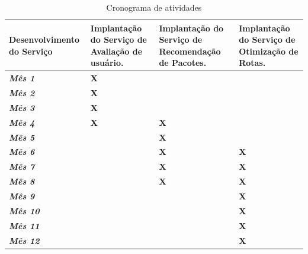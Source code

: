 	\begin{table}[H]
		\centering
		\caption{Cronograma de atividades}
		\begin{tabularx}{\linewidth}{|*4{>{\centering\arraybackslash}X|}}
			\toprule
			\textbf{Desenvolvimento do Serviço} & \textbf{Implantação do Serviço de Avaliação de usuário.} & \textbf{Implantação do Serviço de Recomendação de Pacotes.} & \textbf{Implantação do Serviço de Otimização de Rotas.} \\
			\midrule
			\textit{\textbf{Mês 1}} & \textbf{X} & \textbf{} & \textbf{} \\ [1.2ex] \hline
			\textit{\textbf{Mês 2}} & \textbf{X} & \textbf{} & \textbf{} \\ [1.2ex] \hline
			\textit{\textbf{Mês 3}} & \textbf{X} & \textbf{} & \textbf{} \\ [1.2ex] \hline
			\textit{\textbf{Mês 4}} & \textbf{X} & \textbf{X} & \textbf{} \\ [1.2ex] \hline
			\textit{\textbf{Mês 5}} & \textbf{} & \textbf{X} & \textbf{} \\ [1.2ex] \hline
			\textit{\textbf{Mês 6}} & \textbf{} & \textbf{X} & \textbf{X} \\ [1.2ex] \hline
			\textit{\textbf{Mês 7}} & \textbf{} & \textbf{X} & \textbf{X} \\ [1.2ex] \hline
			\textit{\textbf{Mês 8}} & \textbf{} & \textbf{X} & \textbf{X} \\ [1.2ex] \hline
			\textit{\textbf{Mês 9}} & \textbf{} & \textbf{} & \textbf{X} \\ [1.2ex] \hline
			\textit{\textbf{Mês 10}} & \textbf{} & \textbf{} & \textbf{X} \\ [1.2ex] \hline
			\textit{\textbf{Mês 11}} & \textbf{} & \textbf{} & \textbf{X} \\ [1.2ex] \hline
			\textit{\textbf{Mês 12}} & \textbf{} & \textbf{} & \textbf{X} \\ [1.2ex]
			\bottomrule
		\end{tabularx}%
		\label{tab:addlabel}%
	\end{table}%